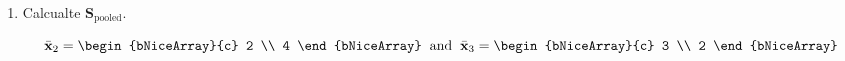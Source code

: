 \begin{enumerate}[label= (\alph*)]
    \item Calcualte $\textbf{S}_{\text{pooled}}$.
    
    \[
        \bar{\textbf{x}}_{2}
        =
        \begin{bNiceArray}{c}
            2 \\
            4
        \end{bNiceArray}
        \hspace{0.2cm}
        \text{and}
        \hspace{0.2cm}
        \bar{\textbf{x}}_{3}
        =
        \begin{bNiceArray}{c}
            3 \\
            2
        \end{bNiceArray}
    \]
    

\end{enumerate}
